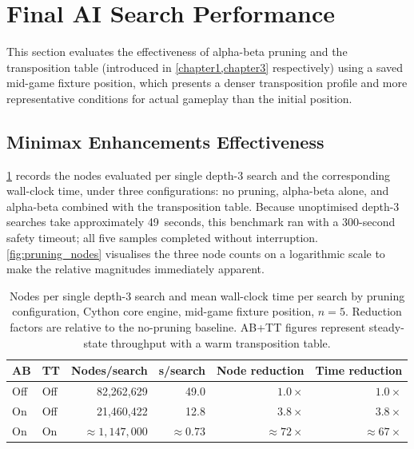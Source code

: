 \section{Final AI Search Performance}
\label{sec:search_perf}

This section evaluates the effectiveness of alpha-beta pruning and the transposition table
(introduced in \cref{chapter1,chapter3} respectively) using a saved
mid-game fixture position, which presents a denser transposition profile and more
representative conditions for actual gameplay than the initial position.

\subsection{Minimax Enhancements Effectiveness}


\cref{tab:ab_pruning} records the nodes evaluated per single depth-3 search and the
corresponding wall-clock time, under three configurations: no pruning, alpha-beta alone,
and alpha-beta combined with the transposition table. Because unoptimised depth-3 searches
take approximately 49~seconds, this benchmark ran with a 300-second safety timeout; all
five samples completed without interruption. \cref{fig:pruning_nodes} visualises the
three node counts on a logarithmic scale to make the relative magnitudes immediately
apparent.

\begin{table}[ht]
  \centering
  \begin{tabular}{llrrrr}
    \hline
    \textbf{AB} & \textbf{TT}             & \textbf{Nodes/search}    & \textbf{s/search}
                & \textbf{Node reduction} & \textbf{Time reduction}                                                                  \\
    \hline
    Off         & Off                     & 82{,}262{,}629           & 49.0              & $1.0\times$         & $1.0\times$         \\
    On          & Off                     & 21{,}460{,}422           & 12.8              & $3.8\times$         & $3.8\times$         \\
    On          & On                      & ${\approx}1{,}147{,}000$ & ${\approx}0.73$   & ${\approx}72\times$ & ${\approx}67\times$ \\
    \hline
  \end{tabular}
  \caption{Nodes per single depth-3 search and mean wall-clock time per search by pruning
    configuration, Cython core engine, mid-game fixture position, $n = 5$.
    Reduction factors are relative to the no-pruning baseline.
    AB+TT figures represent steady-state throughput with a warm transposition table.}
  \label{tab:ab_pruning}
\end{table}

